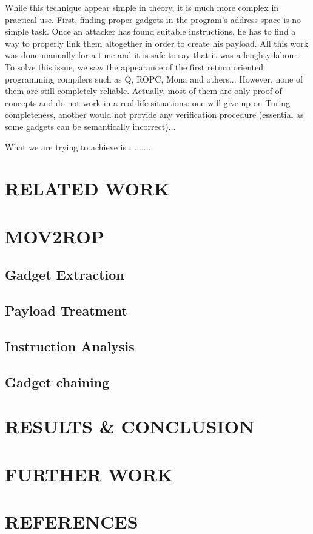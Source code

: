 \documentclass[10pt,twocolumn]{article}
\begin{document}
While this technique appear simple in theory, it is much more complex in practical use. First, finding proper gadgets in the program's address space is no simple task. Once an attacker has found suitable instructions, he has to find a way to properly link them altogether in order to create his payload. All this work was done manually for a time and it is safe to say that it was a lenghty labour. To solve this issue, we saw the appearance of the first return oriented programming compilers such as Q, ROPC, Mona and others... However, none of them are still 
completely reliable. Actually, most of them are only proof of concepts and do not work in a real-life situations: one will give up on Turing completeness, another would not provide any verification procedure (essential as some gadgets can be semantically incorrect)...

What we are trying to achieve is : ........
\section{RELATED WORK}
\lipsum[1]

\section{MOV2ROP}
\lipsum[1]
\subsection{Gadget Extraction}
\lipsum[1]
\subsection{Payload Treatment}
\lipsum[1]
\subsection{Instruction Analysis}
\lipsum[1]
\subsection{Gadget chaining}
\lipsum[1]

\section{RESULTS \& CONCLUSION}
\lipsum[1]
\section{FURTHER WORK}
\lipsum[1]

\section{REFERENCES}
\begingroup
\renewcommand{\section}[2]{}
    
    
\endgroup
\end{document}
